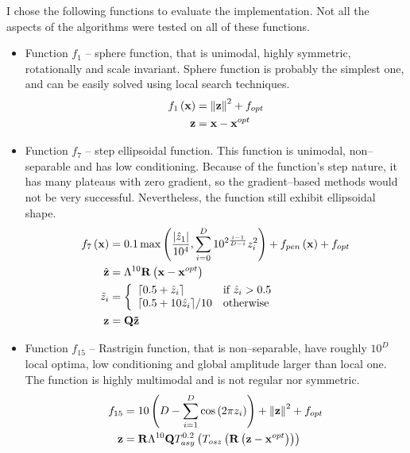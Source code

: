 I chose the following functions to evaluate the implementation. Not all the aspects of the algorithms were tested on all of these functions.
\begin{itemize}
    \item Function $f_1$ -- sphere function, that is unimodal, highly symmetric, rotationally and scale invariant. Sphere function is probably the simplest one, and can be easily solved using local search techniques.
    \begin{align*}
        f_{1}\left(\mathbf{x}\right) &= \left\lVert\mathbf{z}\right\rVert^2+f_{opt} \\
        \mathbf{z} &= \mathbf{x} - \mathbf{x}^{opt}
    \end{align*}
    \item Function $f_7$ -- step ellipsoidal function. This function is unimodal, non--separable and has low conditioning. Because of the function's step nature, it has many plateaus with zero gradient, so the gradient--based methods would not be very successful. Nevertheless, the function still exhibit ellipsoidal shape. 
    \begin{align*}
        f_{7}\left(\mathbf{x}\right) &= 0.1\max\left( \frac{\abs{\hat{z}_1}}{10^4}, \sum_{i=0}^D 10^{2\frac{i-1}{D-i}}z_i^2 \right) + f_{pen}\left( \mathbf{x} \right)+f_{opt} \\
        \hat{\mathbf{z}} &= \Lambda^{10}\mathbf{R} \left( \mathbf{x} - \mathbf{x}^{opt} \right) \\
        \tilde{z}_i &=\left\{ 
            \begin{array}{ll}
                \lceil 0.5 + \hat{z}_i \rceil       & \text{if}\ \hat{z}_i>0.5 \\
                \lceil 0.5 + 10\hat{z}_i\rceil / 10 & \text{otherwise}        \\
            \end{array}  
            \right. \\
        \mathbf{z} &= \mathbf{Q}\mathbf{\tilde{z}} 
    \end{align*}
    \item Function $f_{15}$ -- Rastrigin function, that is non--separable, have roughly $10^D$ local optima, low conditioning and global amplitude larger than local one. The function is highly multimodal and is not regular nor symmetric.
    \begin{align*}
        f_{15} &= 10\left( D-\sum_{i=1}^D \cos\left(2 \pi z_i\right) \right) + \norm{\mathbf{z}}^2+f_{opt} \\
        \mathbf{z} &= \mathbf{R}\Lambda^{10}\mathbf{Q}T_{asy}^{0.2} \left( T_{osz}\left(\mathbf{R}\left(\mathbf{z}-\mathbf{x}^{opt}\right)\right) \right)

\end{align*}
\end{itemize}
